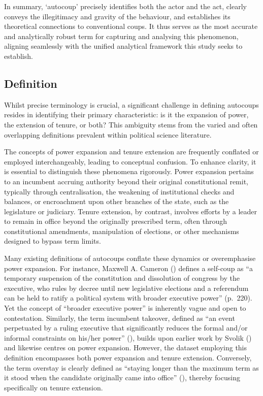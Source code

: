 \documentclass[
  12pt,
]{report}
\begin{document}
In summary, `autocoup' precisely identifies both the actor and the act,
clearly conveys the illegitimacy and gravity of the behaviour, and
establishes its theoretical connections to conventional coups. It thus
serves as the most accurate and analytically robust term for capturing
and analysing this phenomenon, aligning seamlessly with the unified
analytical framework this study seeks to establish.

\subsection*{Definition}\label{sec-definition}

Whilst precise terminology is crucial, a significant challenge in
defining autocoups resides in identifying their primary characteristic:
is it the expansion of power, the extension of tenure, or both? This
ambiguity stems from the varied and often overlapping definitions
prevalent within political science literature.

The concepts of power expansion and tenure extension are frequently
conflated or employed interchangeably, leading to conceptual confusion.
To enhance clarity, it is essential to distinguish these phenomena
rigorously. Power expansion pertains to an incumbent accruing authority
beyond their original constitutional remit, typically through
centralisation, the weakening of institutional checks and balances, or
encroachment upon other branches of the state, such as the legislature
or judiciary. Tenure extension, by contrast, involves efforts by a
leader to remain in office beyond the originally prescribed term, often
through constitutional amendments, manipulation of elections, or other
mechanisms designed to bypass term limits.

Many existing definitions of autocoups conflate these dynamics or
overemphasise power expansion. For instance, Maxwell A. Cameron
() defines a self-coup as ``a
temporary suspension of the constitution and dissolution of congress by
the executive, who rules by decree until new legislative elections and a
referendum can be held to ratify a political system with broader
executive power'' (p.~220). Yet the concept of ``broader executive
power'' is inherently vague and open to contestation. Similarly, the
term incumbent takeover, defined as ``an event perpetuated by a ruling
executive that significantly reduces the formal and/or informal
constraints on his/her power'' (), builds upon earlier work by Svolik
() and likewise centres on power
expansion. However, the dataset employing this definition encompasses
both power expansion and tenure extension. Conversely, the term overstay
is clearly defined as ``staying longer than the maximum term as it stood
when the candidate originally came into office''
(), thereby focusing specifically on tenure extension.
\end{document}
